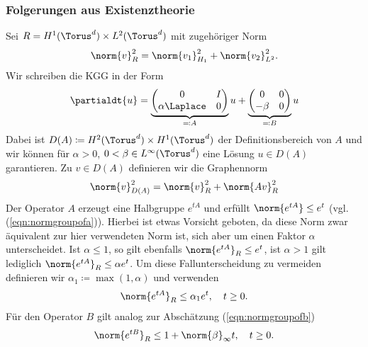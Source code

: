 \subsubsection*{Folgerungen aus Existenztheorie}
Sei $R=H^1(\Torus^d)\times L^2(\Torus^d)$ mit zugehöriger Norm
\[\norm{v}_R^2=\norm{v_1}_{H_1}^2+\norm{v_2}_{L^2}^2.\]
Wir schreiben die KGG in der Form
\[\partialdt{u}=\underbrace{\begin{pmatrix}0 & I\\ \alpha\Laplace & 0\end{pmatrix}}_{\eqqcolon A}u+\underbrace{\begin{pmatrix}0 & 0\\ -\beta & 0\end{pmatrix}}_{\eqqcolon B}u\]
Dabei ist $D(A)\coloneqq H^2(\Torus^d)\times H^1(\Torus^d)$ der Definitionsbereich von $A$ und wir können für $\alpha>0$, $0<\beta\in L^\infty(\Torus^d)$ eine Lösung $u\in D(A)$ garantieren. Zu $v\in D(A)$ definieren wir die Graphennorm
\[\norm{v}_{D(A)}^2=\norm{v}_R^2+\norm{Av}_R^2\]
Der Operator $A$ erzeugt eine Halbgruppe $e^{tA}$ und erfüllt $\norm{e^{tA}}\le e^t$ (vgl. (\ref{eqn:normgroupofa})). Hierbei ist etwas Vorsicht geboten, da diese Norm zwar äquivalent zur hier verwendeten Norm ist, sich aber um einen Faktor $\alpha$ unterscheidet. Ist $\alpha\le 1$, so gilt ebenfalls $\norm{e^{tA}}_R\le e^t$, ist $\alpha>1$ gilt lediglich $\norm{e^{tA}}_R\le \alpha e^t$. Um diese Fallunterscheidung zu vermeiden definieren wir $\alpha_1\coloneqq \max(1,\alpha)$ und verwenden
\[\norm{e^{tA}}_R\le \alpha_1 e^t, \quad t\ge 0.\]
Für den Operator $B$ gilt analog zur Abschätzung (\ref{eqn:normgroupofb}) 
\[\norm{e^{tB}}_R\le 1+\norm{\beta}_\infty t, \quad t\ge 0.\]
